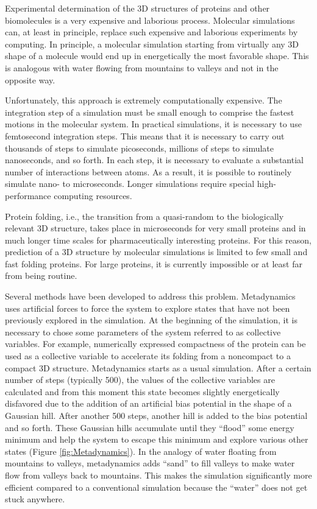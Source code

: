 Experimental determination of the 3D structures of proteins and other
biomolecules is a very expensive and laborious process. Molecular
simulations can, at least in principle, replace such expensive and
laborious experiments by computing. In principle, a molecular simulation
starting from virtually any 3D shape of a molecule would end up in
energetically the most favorable shape. This is analogous with water
flowing from mountains to valleys and not in the opposite way.

Unfortunately, this approach is extremely computationally expensive. The
integration step of a simulation must be small enough to comprise the
fastest motions in the molecular system. In practical simulations, it is
necessary to use femtosecond integration steps. This means that it is
necessary to carry out thousands of steps to simulate picoseconds,
millions of steps to simulate nanoseconds, and so forth. In each step,
it is necessary to evaluate a substantial number of interactions between
atoms. As a result, it is possible to routinely simulate nano- to
microseconds. Longer simulations require special high-performance
computing resources.

Protein folding, i.e., the transition from a quasi-random to the
biologically relevant 3D structure, takes place in microseconds for very
small proteins and in much longer time scales for pharmaceutically
interesting proteins. For this reason, prediction of a 3D structure by
molecular simulations is limited to few small and fast folding proteins.
For large proteins, it is currently impossible or at least far from
being routine.

Several methods have been developed to address this problem.
Metadynamics \citep{mtd} uses artificial forces to force the system to
explore states that have not been previously explored in the simulation.
At the beginning of the simulation, it is necessary to chose some
parameters of the system referred to as collective variables. For
example, numerically expressed compactness of the protein can be used as
a collective variable to accelerate its folding from a noncompact to a
compact 3D structure. Metadynamics starts as a usual simulation. After a
certain number of steps (typically 500), the values of the collective
variables are calculated and from this moment this state becomes
slightly energetically disfavored due to the addition of an artificial
bias potential in the shape of a Gaussian hill. After another 500 steps,
another hill is added to the bias potential and so forth. These Gaussian
hills accumulate until they ``flood'' some energy minimum and help the
system to escape this minimum and explore various other states (Figure
\ref{fig:Metadynamics}). In the analogy of water floating from mountains
to valleys, metadynamics adds ``sand'' to fill valleys to make water
flow from valleys back to mountains. This makes the simulation
significantly more efficient compared to a conventional simulation
because the ``water'' does not get stuck anywhere.

